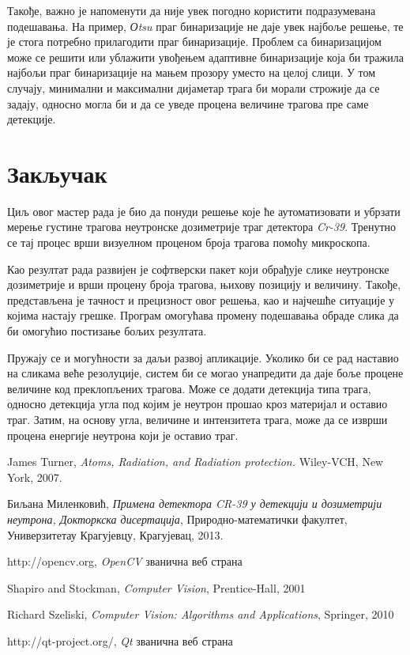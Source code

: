 \documentclass[11pt,a4paper,serbian,oneside]{book}
\begin{document}
Такође, важно је напоменути да није увек погодно користити подразумевана подешавања. На пример, \textit{Оtsu} праг бинаризације не даје увек најбоље решење, те је стога потребно прилагодити праг бинаризације. Проблем са бинаризацијом може се решити или ублажити увођењем адаптивне бинаризације која би тражила најбољи праг бинаризације на мањем прозору уместо на целој слици. У том случају, минимални и максимални дијаметар трага би морали строжије да се задају, односно могла би и да се уведе процена величине трагова пре саме детекције.


%
%
%

\chapter{Закључак}

Циљ овог мастер рада је био да понуди решење које ће аутоматизовати и убрзати мерење густине трагова неутронске дозиметрије траг детектора \textit{Cr-39}. Тренутно се тај процес врши визуелном проценом броја трагова помоћу микроскопа.

Као резултат рада развијен је софтверски пакет који обрађује слике неутронске до\-зи\-мет\-ри\-је и врши процену броја трагова, њихову позицију и величину. Такође, представљена је тачност и прецизност овог решења, као и најчешће ситуације у којима настају грешке. Програм омогућава промену подешавања обраде слика да би омогућио постизање бољих резултата.

Пружају се и могућности за даљи развој апликације. Уколико би се рад наставио на сликама веће резолуције, систем би се могао унапредити да даје боље процене величине код преклопљених трагова. Може се додати детекција типа трага, односно детекција угла под којим је неутрон прошао кроз материјал и оставио траг. Затим, на основу угла, величине и интензитета трага, може да се изврши процена енергије неутрона који је оставио траг.

%
%
%

\begin{thebibliography}{1}

 {James Turner, \textit{Atoms, Radiation, and Radiation protection.} Wiley-VCH, New York, 2007.}

 {Биљана Миленковић, \textit{Примена детектора CR-39 у детекцији и дозиметрији неутрона, Докторкска дисертација}, Природно-математички факултет, Универзитетау Крагујевцу, Крагујевац, 2013.}

 http://opencv.org, \textit{OpenCV} званична веб страна

 Shapiro and Stockman, \textit{Computer Vision}, Prentice-Hall, 2001

 Richard Szeliski,  \textit{Computer Vision: Algorithms and Applications}, Springer, 2010

 http:\slash \slash qt-project.org/, \textit{Qt} званична веб страна

\end{thebibliography}

	
\end{document}

